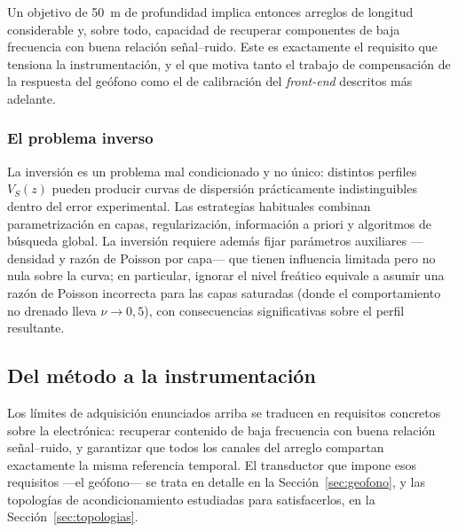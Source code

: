 Un objetivo de \SI{50}{\meter} de profundidad implica entonces arreglos de longitud
considerable y, sobre todo, capacidad de recuperar componentes de baja frecuencia con
buena relaci\'on se\~nal--ruido. Este es exactamente el requisito que tensiona la
instrumentaci\'on, y el que motiva tanto el trabajo de compensaci\'on de la respuesta del
ge\'ofono como el de calibraci\'on del \emph{front-end} descritos m\'as adelante.

\subsubsection{El problema inverso}

La inversi\'on es un problema mal condicionado y no \'unico: distintos perfiles $V_S(z)$
pueden producir curvas de dispersi\'on pr\'acticamente indistinguibles dentro del error
experimental. Las estrategias habituales combinan parametrizaci\'on en capas,
regularizaci\'on, informaci\'on a priori y algoritmos de b\'usqueda global. La inversi\'on
requiere adem\'as fijar par\'ametros auxiliares ---densidad y raz\'on de Poisson por capa---
que tienen influencia limitada pero no nula sobre la curva; en particular, ignorar el
nivel fre\'atico equivale a asumir una raz\'on de Poisson incorrecta para las capas
saturadas (donde el comportamiento no drenado lleva $\nu\to0{,}5$), con consecuencias
significativas sobre el perfil resultante.

\subsection{Del m\'etodo a la instrumentaci\'on}
\label{sec:fund-geofono}

Los l\'imites de adquisici\'on enunciados arriba se traducen en requisitos concretos sobre
la electr\'onica: recuperar contenido de baja frecuencia con buena relaci\'on
se\~nal--ruido, y garantizar que todos los canales del arreglo compartan exactamente la
misma referencia temporal. El transductor que impone esos requisitos ---el ge\'ofono--- se
trata en detalle en la Secci\'on~\ref{sec:geofono}, y las topolog\'ias de acondicionamiento
estudiadas para satisfacerlos, en la Secci\'on~\ref{sec:topologias}.

